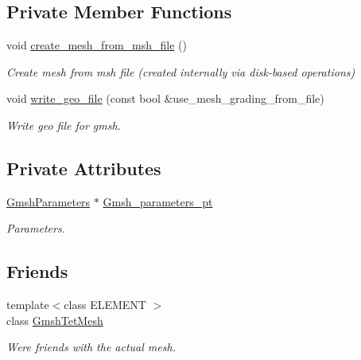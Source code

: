 \subsection*{Private Member Functions}
\begin{DoxyCompactItemize}
\item 
void \hyperlink{classoomph_1_1GmshTetScaffoldMesh_a13c5fa9a126fc1707534031826d8f43f}{create\+\_\+mesh\+\_\+from\+\_\+msh\+\_\+file} ()
\begin{DoxyCompactList}\small\item\em Create mesh from msh file (created internally via disk-\/based operations) \end{DoxyCompactList}\item 
void \hyperlink{classoomph_1_1GmshTetScaffoldMesh_a20ba8fb06fe0264c4ba0b586b104f969}{write\+\_\+geo\+\_\+file} (const bool \&use\+\_\+mesh\+\_\+grading\+\_\+from\+\_\+file)
\begin{DoxyCompactList}\small\item\em Write geo file for gmsh. \end{DoxyCompactList}\end{DoxyCompactItemize}
\subsection*{Private Attributes}
\begin{DoxyCompactItemize}
\item 
\hyperlink{classoomph_1_1GmshParameters}{Gmsh\+Parameters} $\ast$ \hyperlink{classoomph_1_1GmshTetScaffoldMesh_afce3676b4f42501024ba1a933f04600d}{Gmsh\+\_\+parameters\+\_\+pt}
\begin{DoxyCompactList}\small\item\em Parameters. \end{DoxyCompactList}\end{DoxyCompactItemize}
\subsection*{Friends}
\begin{DoxyCompactItemize}
\item 
{\footnotesize template$<$class E\+L\+E\+M\+E\+NT $>$ }\\class \hyperlink{classoomph_1_1GmshTetScaffoldMesh_a542660fc34eb890a935f0d42a3b4eb8a}{Gmsh\+Tet\+Mesh}
\begin{DoxyCompactList}\small\item\em We\textquotesingle{}re friends with the actual mesh. \end{DoxyCompactList}\end{DoxyCompactItemize}
